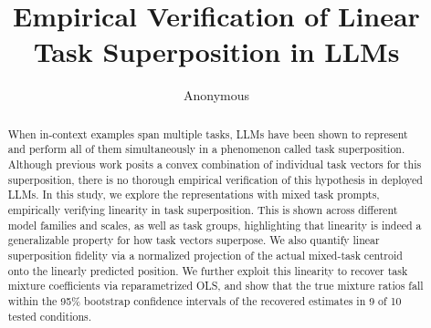 \documentclass[11pt]{article}
\title{Empirical Verification of Linear Task Superposition in LLMs}
\author{Anonymous}
\begin{document}
\maketitle

\begin{abstract}
When in-context examples span multiple tasks, LLMs have been shown to represent and perform all of them simultaneously in a phenomenon called task superposition. Although previous work posits a convex combination of individual task vectors for this superposition, there is no thorough empirical verification of this hypothesis in deployed LLMs. In this study, we explore the representations with mixed task prompts, empirically verifying linearity in task superposition. This is shown across different model families and scales, as well as task groups, highlighting that linearity is indeed a generalizable property for how task vectors superpose. We also quantify linear superposition fidelity via a normalized projection of the actual mixed-task centroid onto the linearly predicted position. We further exploit this linearity to recover task mixture coefficients via reparametrized OLS, and show that the true mixture ratios fall within the 95\% bootstrap confidence intervals of the recovered estimates in 9 of 10 tested conditions.
\end{abstract}
\end{document}
